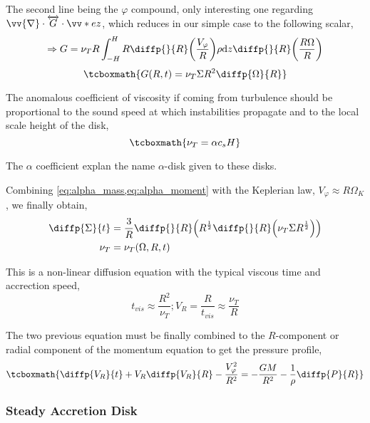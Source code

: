 \documentclass[10pt,a4paper,english,draft]{article}
\let\originalleft\left
\let\originalright\right
\renewcommand{\left}{\mathopen{}\mathclose\bgroup\originalleft}
\renewcommand{\right}{\aftergroup\egroup\originalright}
\begin{document}
The second line being the $\varphi$ compound, only interesting one regarding
$\vv{\nabla} \cdot \overleftrightarrow{G} \cdot \vv*{e}{z}$, which reduces in our simple
case to the following scalar,
\begin{equation*}
    \Rightarrow G = \nu_T R \int_{-H}^H R \diffp{}{R} \left( \frac{V_\varphi}{R} \right) \rho \d{z} \diffp{}{R} \left(\frac{R \Omega}{R}\right)
\end{equation*}
\begin{equation}
    \tcboxmath{
        G(R,t) = \nu_T \Sigma R^2 \diffp{\Omega}{R}
    }
\end{equation}

The anomalous coefficient of viscosity if coming from turbulence should be
proportional to the sound speed at which instabilities propagate and to the
local scale height of the disk,
\begin{equation}
    \tcboxmath{
        \nu_T = \alpha c_s H
    }
\end{equation}

The $\alpha$ coefficient explan the name $\alpha$-disk given to these disks.

Combining \cref{eq:alpha_mass,eq:alpha_moment} with the Keplerian law,
$V_\varphi \approx R \Omega_K$, we finally obtain,
\begin{align*}
    \diffp{\Sigma}{t} &= \frac{3}{R} \diffp{}{R} \left( R^\frac{1}{2} \diffp{}{R} \left( \nu_T \Sigma R^\frac{1}{2} \right) \right) \\
    \nu_T &= \nu_T(\Omega,R,t)
\end{align*}

This is a non-linear diffusion equation with the typical viscous time and
accrection speed,
\begin{equation*}
    t_{vis} \approx \frac{R^2}{\nu_T} ; V_R = \frac{R}{t_{vis}} \approx \frac{\nu_T}{R}
\end{equation*}

The two previous equation must be finally combined to the $R$-component or
radial component of the momentum equation to get the pressure profile,
\begin{equation}
    \tcboxmath{
        \diffp{V_R}{t} + V_R \diffp{V_R}{R} - \frac{V_\varphi^2}{R^2} = - \frac{GM}{R^2} - \frac{1}{\rho} \diffp{P}{R}
    }
\end{equation}

\subsubsection{Steady Accretion Disk}
\end{document}
